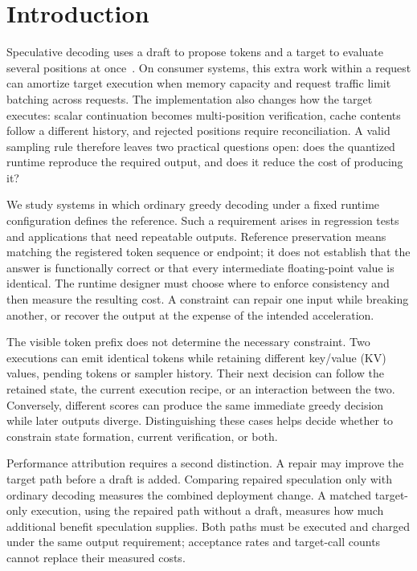\section{Introduction}
\label{sec:introduction}
Speculative decoding uses a draft to propose tokens and a target to evaluate several positions at once~\cite{leviathan2023}. On consumer systems, this extra work within a request can amortize target execution when memory capacity and request traffic limit batching across requests. The implementation also changes how the target executes: scalar continuation becomes multi-position verification, cache contents follow a different history, and rejected positions require reconciliation. A valid sampling rule therefore leaves two practical questions open: does the quantized runtime reproduce the required output, and does it reduce the cost of producing it?

We study systems in which ordinary greedy decoding under a fixed runtime configuration defines the reference. Such a requirement arises in regression tests and applications that need repeatable outputs. Reference preservation means matching the registered token sequence or endpoint; it does not establish that the answer is functionally correct or that every intermediate floating-point value is identical. The runtime designer must choose where to enforce consistency and then measure the resulting cost. A constraint can repair one input while breaking another, or recover the output at the expense of the intended acceleration.

The visible token prefix does not determine the necessary constraint. Two executions can emit identical tokens while retaining different key/value (KV) values, pending tokens or sampler history. Their next decision can follow the retained state, the current execution recipe, or an interaction between the two. Conversely, different scores can produce the same immediate greedy decision while later outputs diverge. Distinguishing these cases helps decide whether to constrain state formation, current verification, or both.

Performance attribution requires a second distinction. A repair may improve the target path before a draft is added. Comparing repaired speculation only with ordinary decoding measures the combined deployment change. A matched target-only execution, using the repaired path without a draft, measures how much additional benefit speculation supplies. Both paths must be executed and charged under the same output requirement; acceptance rates and target-call counts cannot replace their measured costs.

